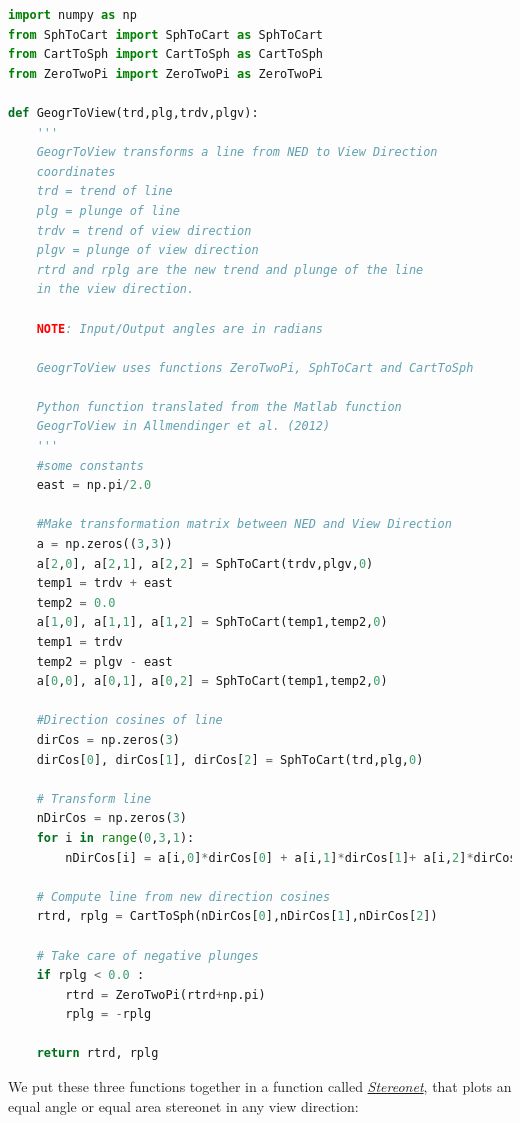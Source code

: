 \documentclass[a4paper , 12pt]{book}
\begin{document}
\begin{lstlisting}[language=Python, frame=single]
import numpy as np
from SphToCart import SphToCart as SphToCart
from CartToSph import CartToSph as CartToSph
from ZeroTwoPi import ZeroTwoPi as ZeroTwoPi

def GeogrToView(trd,plg,trdv,plgv):
    '''
	GeogrToView transforms a line from NED to View Direction
	coordinates
	trd = trend of line
   	plg = plunge of line 
   	trdv = trend of view direction 
   	plgv = plunge of view direction 
   	rtrd and rplg are the new trend and plunge of the line 
   	in the view direction.

   	NOTE: Input/Output angles are in radians

   	GeogrToView uses functions ZeroTwoPi, SphToCart and CartToSph

   	Python function translated from the Matlab function 
   	GeogrToView in Allmendinger et al. (2012)
	'''
    #some constants 
    east = np.pi/2.0
    
    #Make transformation matrix between NED and View Direction
    a = np.zeros((3,3))
    a[2,0], a[2,1], a[2,2] = SphToCart(trdv,plgv,0)
    temp1 = trdv + east
    temp2 = 0.0
    a[1,0], a[1,1], a[1,2] = SphToCart(temp1,temp2,0)
    temp1 = trdv
    temp2 = plgv - east
    a[0,0], a[0,1], a[0,2] = SphToCart(temp1,temp2,0)
     
    #Direction cosines of line
    dirCos = np.zeros(3)
    dirCos[0], dirCos[1], dirCos[2] = SphToCart(trd,plg,0)
      
    # Transform line
    nDirCos = np.zeros(3)
    for i in range(0,3,1):
        nDirCos[i] = a[i,0]*dirCos[0] + a[i,1]*dirCos[1]+ a[i,2]*dirCos[2]
    
    # Compute line from new direction cosines
    rtrd, rplg = CartToSph(nDirCos[0],nDirCos[1],nDirCos[2])
    
    # Take care of negative plunges
    if rplg < 0.0 :
        rtrd = ZeroTwoPi(rtrd+np.pi)
        rplg = -rplg
    
    return rtrd, rplg
\end{lstlisting}

We put these three functions together in a function called \href{http://github.com}{\textit{Stereonet}}, that plots an equal angle or equal area stereonet in any view direction:
\end{document}

